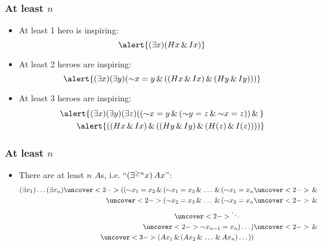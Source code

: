 \begin{frame}
    \frametitle{At least $n$}

\begin{itemize}[<+->]
\item At least 1 hero is inspiring:
\[
\alert{\qt{\exists}{x}(H\qv{x} \land I\qv{x})}
\]
\item At least 2 heroes are inspiring:
\[
\alert{\qt{\exists}{x}\qt{\exists}{y}(\enot x = y \land ((H\qv{x} \land I\qv{x}) \land (H\qv{y} \land I\qv{y})))}
\]
\item At least 3 heroes are inspiring:
\begin{align*}
& \alert{\qt{\exists}{x}\qt{\exists}{y}\qt{\exists}{z}((\enot x = y \land (\enot y = z \land \enot x = z)) \eand {}} \\
& \qquad \alert{((H\qv{x} \land I\qv{x}) \land ((H\qv{y} \land I\qv{y}) \eand (H(z) \land I(z))))}
\end{align*}
\end{itemize}
\end{frame}


\begin{frame}
  \frametitle{At least $n$}

\begin{itemize}
\item There are at least $n$ $A$s, i.e. ``$(\exists^{\ge n} x)\,Ax$'':
\begin{align*}
\qt{\exists}{x_1}\dots\qt{\exists}{x_n}\uncover<2->{((\enot x_1 = x_2 \land (\enot x_1 = x_3 \land \dots \land (\enot x_1 = x_n} & \uncover<2->{{} \land {}}\\
\uncover<2->{(\enot x_2 = x_3 \land \dots \land (\enot x_2 = x_n} & \uncover<2->{{} \land {}}\\
\uncover<2->{\ddots}\qquad &\\
\uncover<2->{\enot x_{n-1} = x_n)\dots)} & \uncover<2->{{} \land {}}\\
\uncover<3->{(A\qv{x_1} \land (A\qv{x_2} \land \dots \land A\qv{x_n})\dots))}
\end{align*}
\end{itemize}
\end{frame}

